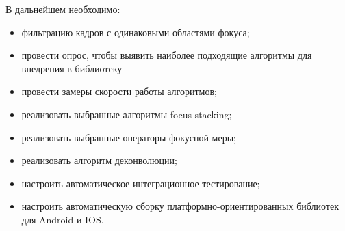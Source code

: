 \documentclass[14pt]{matmex-diploma-custom}
\begin{document}
В дальнейшем необходимо:
\begin{itemize}
    \item фильтрацию кадров с одинаковыми областями фокуса;
    \item провести опрос, чтобы выявить наиболее подходящие алгоритмы для внедрения в библиотеку
    \item провести замеры скорости работы алгоритмов;
    \item реализовать выбранные алгоритмы focus stacking;
    \item реализовать выбранные операторы фокусной меры;
    \item реализовать алгоритм деконволюции;
    \item настроить автоматическое интеграционное тестирование;
    \item настроить автоматическую сборку платформно-ориентированных библиотек для Android и IOS.
\end{itemize}

\setmonofont[Mapping=tex-text]{CMU Typewriter Text}


\end{document}
